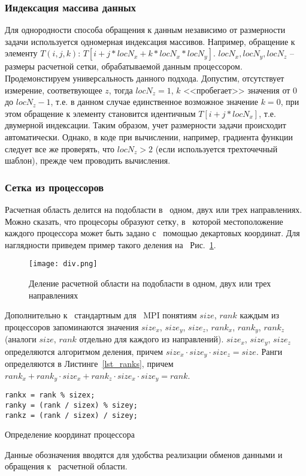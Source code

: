 \subsubsection{Индексация массива данных}
Для однородности способа обращения к данным независимо
от размерности задачи используется одномерная индексация массивов.
Например, обращение к элементу $T(i,j,k)$:
$T[i + j * locN_x + k * locN_x * locN_y]$.
$locN_x, locN_y, locN_z$ -- размеры расчетной сетки, обрабатываемой
данным процессором. Продемонстируем универсальность данного
подхода. Допустим, отсутствует измерение, соответвующее $z$, тогда
$locN_z=1$, $k$ <<пробегает>> значения от $0$ до $locN_z-1$, т.е.
в данном случае единственное возможное значение $k=0$, при этом
обращение к элементу становится идентичным $T[i + j * locN_x]$, т.е.
двумерной индексации. Таким образом, учет размерности задачи
происходит автоматически. Однако, в коде при вычислении,
например, градиента функции следует все же проверять, что $locN_z > 2$
(если используется трехточечный шаблон),
прежде чем проводить вычисления.

\subsubsection{Сетка из процессоров}
Расчетная область делится на подобласти в~ одном, двух или трех направлениях.
Можно сказать, что процесоры образуют сетку, в~ которой
местоположение каждого процессора может быть задано с~ помощью
декартовых координат.
Для наглядности приведем пример такого деления на~ Рис.~\ref{pic_div}.
\begin{figure}[!h]\center
\texttt{[image: div.png]} 
\caption{Деление расчетной области на подобласти в одном, двух или трех направлениях}
\label{pic_div}
\end{figure}
Дополнительно к~ стандартным для~ MPI понятиям $size$, $rank$
каждым из процессоров запоминаются значения $size_x$, $size_y$, $size_z$,
$rank_x$, $rank_y$, $rank_z$ (аналоги $size$, $rank$ отдельно для каждого из направлений).
$size_x$, $size_y$, $size_z$ определяются алгоритмом деления,
причем $size_x \cdot size_y \cdot size_z = size$.
Ранги определяются в Листинге~\ref{lst_ranks}, причем
$rank_x + rank_y \cdot size_x + rank_z \cdot size_x \cdot size_y = rank$.
\begin{listing}[!h]
\begin{verbatim}
rankx = rank % sizex;
ranky = (rank / sizex) % sizey;
rankz = (rank / sizex) / sizey;
\end{verbatim}
\caption{Определение координат процессора}
\label{lst_ranks}
\end{listing}
Данные обозначения вводятся для удобства реализации обменов
данными и~ обращения к~ расчетной области.

